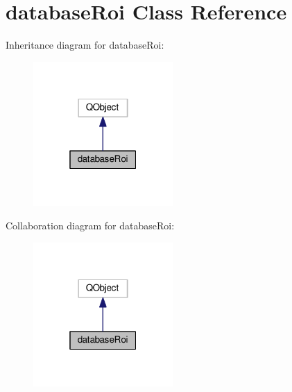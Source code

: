 \hypertarget{classdatabaseRoi}{}\section{database\+Roi Class Reference}
\label{classdatabaseRoi}


Inheritance diagram for database\+Roi\+:\nopagebreak
\begin{figure}[H]
\begin{center}
\leavevmode
\includegraphics[width=151pt]{classdatabaseRoi__inherit__graph}
\end{center}
\end{figure}


Collaboration diagram for database\+Roi\+:\nopagebreak
\begin{figure}[H]
\begin{center}
\leavevmode
\includegraphics[width=151pt]{classdatabaseRoi__coll__graph}
\end{center}
\end{figure}
